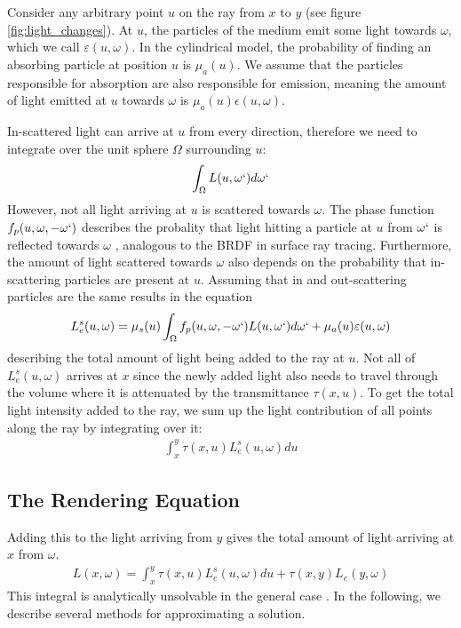 Consider any arbitrary point ${u}$ on the ray from ${x}$ to ${y}$ (see figure \ref{fig:light_changes}).
At ${u}$, the particles of the medium emit some light towards $\omega$\cite{468400}, which we call $\varepsilon ({u}, \omega )$. In the cylindrical model, the probability of finding an absorbing particle at position ${u}$ is ${\mu}_a({u})$. We assume that the particles responsible for absorption are also responsible for emission\cite{468400}, meaning the amount of light emitted at ${u}$ towards $\omega$ is ${\mu}_a({u})\epsilon ({u}, \omega )$.

In-scattered light can arrive at ${u}$ from every direction, therefore we need to integrate over the unit sphere $\Omega$ surrounding ${u}$\cite{10.1145/280814.280925}:
\begin{align*}
\int_{\Omega} L({u}, \omega `)d\omega `
\end{align*}
However, not all light arriving at ${u}$ is scattered towards $\omega $. The phase function $f_p({u}, \omega , -\omega `)$ describes the probality that light hitting a particle at ${u}$ from $\omega `$ is reflected towards $\omega$ \cite{10.1145/280814.280925, Cerezo2005}, analogous to the BRDF \cite{10.1145/965141.563893} in surface ray tracing. Furthermore, the amount of light scattered towards $\omega $ also depends on the probability that in-scattering particles are present at ${u}$\cite{10.1145/280814.280925}. Assuming that in and out-scattering particles are the same results in the equation
\begin{align*}
L_e^s({u}, \omega ) = {\mu}_s({u})\int_{\Omega} f_p({u}, \omega , -\omega `)L({u}, \omega `)d\omega `  + {\mu}_a({u})\varepsilon ({u}, \omega )
\end{align*}
describing the total amount of light being added to the ray at ${u}$.
Not all of $L_e^s({u}, \omega )$ arrives at ${x}$ since the newly added light also needs to travel through the volume where it is attenuated by the transmittance $\tau ({x}, {u})$.
To get the total light intensity added to the ray, we sum up the light contribution of all points along the ray by integrating over it\cite{zhou2007real-time}:
\begin{align*}
\int_{{x}}^{{y}} \tau({x}, {u})L_e^s({u}, \omega )d{u}
\end{align*}
\subsection{The Rendering Equation}
Adding this to the light arriving from ${y}$ gives the total amount of light arriving at ${x}$ from $\omega $.
\begin{align*}
L({x}, \omega ) = {\int_{{x}}^{{y}} \tau({x}, {u})L_e^s({u}, \omega )d{u}} + \tau({x}, {y}) L_e({y}, \omega )
\end{align*}
This integral is analytically unsolvable in the general case \cite{10.1145/964965.808594}.
In the following, we describe several methods for approximating a solution.











